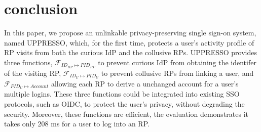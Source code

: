\section{conclusion}
\label{sec:conclusion}
In this paper, we propose an unlinkable privacy-preserving single sign-on system, named UPPRESSO, which, for the first time, protects a user's activity profile of RP visits from both the curious IdP and the collusive RPs.
UPPRESSO provides three functions, $\mathcal{F}_{ID_{RP} \mapsto PID_{RP}}$ to prevent curious IdP from obtaining the identifer of the visiting RP,
 $\mathcal{F}_{ID_{U} \mapsto PID_{U}}$ to prevent collusive RPs from linking a user, and $\mathcal{F}_{PID_{U} \mapsto Account}$ allowing each RP to derive a unchanged account for a user's multiple logins. 
These three functions could be integrated into existing SSO protocols, such as OIDC, to protect the user's privacy, without degrading the security.
Moreover, these functions are efficient, the evaluation demonstrates it takes only 208 ms for a user to log into an RP.
